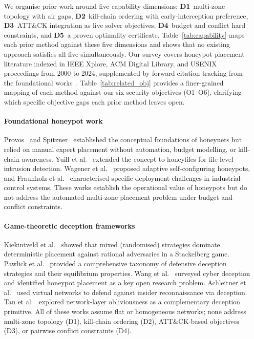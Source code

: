 \documentclass[journal]{IEEEtran}
\begin{document}
We organise prior work around five capability dimensions:
\textbf{D1}~multi-zone topology with air gaps, \textbf{D2}~kill-chain
ordering with early-interception preference, \textbf{D3}~ATT\&CK
integration as live solver objectives, \textbf{D4}~budget and
conflict hard constraints, and \textbf{D5}~a proven optimality
certificate. Table~\ref{tab:capability} maps each prior method
against these five dimensions and shows that no existing approach
satisfies all five simultaneously. Our survey covers honeypot
placement literature indexed in IEEE Xplore, ACM Digital Library,
and USENIX proceedings from 2000 to 2024, supplemented by forward
citation tracking from the foundational
works~\cite{provos2004,spitzner2003,kiekintveld2015}.
Table~\ref{tab:related_obj} provides a finer-grained mapping of each
method against our six security objectives (O1--O6), clarifying
which specific objective gaps each prior method leaves open.

\paragraph{Foundational honeypot work}
Provos~\cite{provos2004} and Spitzner~\cite{spitzner2003} established
the conceptual foundations of honeynets but relied on manual expert
placement without automation, budget modelling, or kill-chain
awareness. Yuill et al.~\cite{yuill2004} extended the concept to
honeyfiles for file-level intrusion detection. Wagener et
al.~\cite{wagener2009} proposed adaptive self-configuring honeypots,
and Fraunholz et al.~\cite{fraunholz2017} characterised specific
deployment challenges in industrial control systems. These works
establish the operational value of honeypots but do not address the
automated multi-zone placement problem under budget and conflict
constraints.

\paragraph{Game-theoretic deception frameworks}
Kiekintveld et al.~\cite{kiekintveld2015} showed that mixed (randomised)
strategies dominate deterministic placement against rational adversaries
in a Stackelberg game. Pawlick et al.~\cite{pawlick2019} provided a
comprehensive taxonomy of defensive deception strategies and their
equilibrium properties. Wang et al.~\cite{wang2018} surveyed cyber
deception and identified honeypot placement as a key open research
problem. Achleitner et al.~\cite{achleitner2017} used virtual networks
to defend against insider reconnaissance via deception. Tan et
al.~\cite{tan2011} explored network-layer obliviousness as a
complementary deception primitive. All of these works assume flat or
homogeneous networks; none address multi-zone topology (D1),
kill-chain ordering (D2), ATT\&CK-based objectives (D3), or
pairwise conflict constraints (D4).
\end{document}
